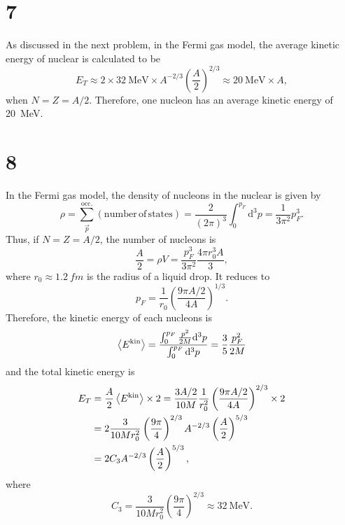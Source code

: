 \documentclass[a4paper,11pt]{jsarticle}
\begin{document}
\section*{7}
As discussed in the next problem, in the Fermi gas model, the average kinetic energy of nuclear is calculated to be
\begin{equation}
  E_T \approx 2\times \SI{32}{\MeV}\times A^{-2/3}\left(\frac{A}{2}\right)^{2/3} \approx \SI{20}{\MeV} \times A,
\end{equation}
when $N=Z=A/2$.
Therefore, one nucleon has an average kinetic energy of \SI{20}{\MeV}.

\section*{8}
In the Fermi gas model, the density of nucleons in the nuclear is given by 
\begin{equation}
  \rho = \sum_{\vec{p}}^{\mathrm{occ.}} (\mathrm{number\,of\,states}) = \frac{2}{(2\pi)^3} \int_0^{p_F} \mathrm{d}^3 p = \frac{1}{3\pi^2} p_F^3.
\end{equation}
Thus, if $N=Z=A/2$, the number of nucleons is 
\begin{equation}
  \frac{A}{2} = \rho V = \frac{p_F^3}{3\pi^2} \frac{4\pi r_0^3 A}{3},
\end{equation}
where $r_0\approx \SI{1.2}{fm}$ is the radius of a liquid drop.
It reduces to
\begin{equation}
  p_F = \frac{1}{r_0}\left(\frac{9\pi A/2}{4A}\right)^{1/3}.
\end{equation}
Therefore, the kinetic energy of each nucleons is
\begin{equation}
  \ev{E^{\mathrm{kin}}} = \frac{\int_0^{p_F} \frac{p^2}{2M}\mathrm{d}^3 p}{\int_0^{p_F}\mathrm{d}^3 p} = \frac{3}{5}\frac{p_F^2}{2M}
\end{equation}
and the total kinetic energy is 
\begin{align}
  E_T 
  &= \frac{A}{2} \ev{E^{\mathrm{kin}}} \times 2 = \frac{3A/2}{10M}\frac{1}{r_0^2}\left(\frac{9\pi A/2}{4A}\right)^{2/3} \times 2 \notag\\
  &= 2\frac{3}{10Mr_0^2}\left(\frac{9\pi}{4}\right)^{2/3} A^{-2/3}\left(\frac{A}{2}\right)^{5/3} \notag \\
  &= 2C_3A^{-2/3}\left(\frac{A}{2}\right)^{5/3},
\end{align}
where
\begin{equation}
  C_3 = \frac{3}{10Mr_0^2}\left(\frac{9\pi}{4}\right)^{2/3} \approx \SI{32}{\MeV}.
\end{equation}
\end{document}
